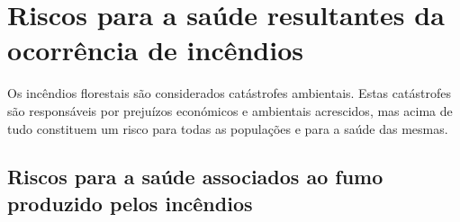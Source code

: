 \documentclass{report}
\begin{document}
\chapter{Riscos para a saúde resultantes da ocorrência de incêndios}
\cite{dgsefeitos-fumo}

Os incêndios florestais são considerados catástrofes ambientais. Estas catástrofes são responsáveis por prejuízos económicos e ambientais acrescidos, mas acima de tudo constituem um risco para todas as populações e para a saúde das mesmas.

\section{Riscos para a saúde associados ao fumo produzido pelos incêndios}
\label{riscos para a saúde associados ao fumo produzido pelos incêndios}
\cite{dgsefeitos-fumo}
\end{document}
